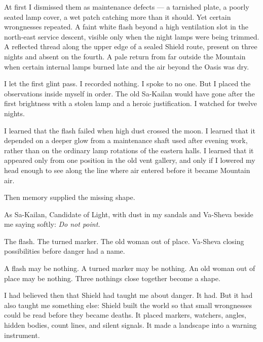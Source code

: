 At first I dismissed them as maintenance defects --- a tarnished plate, a poorly seated lamp cover, a wet patch catching more than it should. Yet certain wrongnesses repeated. A faint white flash beyond a high ventilation slot in the north-east service descent, visible only when the night lamps were being trimmed. A reflected thread along the upper edge of a sealed Shield route, present on three nights and absent on the fourth. A pale return from far outside the Mountain when certain internal lamps burned late and the air beyond the Oasis was dry.\par

I let the first glint pass. I recorded nothing. I spoke to no one. But I placed the observations inside myself in order. The old Sa-Kailan would have gone after the first brightness with a stolen lamp and a heroic justification. I watched for twelve nights.\par

I learned that the flash failed when high dust crossed the moon. I learned that it depended on a deeper glow from a maintenance shaft used after evening work, rather than on the ordinary lamp rotations of the eastern halls. I learned that it appeared only from one position in the old vent gallery, and only if I lowered my head enough to see along the line where air entered before it became Mountain air.\par

Then memory supplied the missing shape.\par

As Sa-Kailan, Candidate of Light, with dust in my sandals and Va-Sheva beside me saying softly: \textit{Do not point.}\par

The flash. The turned marker. The old woman out of place. Va-Sheva closing possibilities before danger had a name.\par

A flash may be nothing. A turned marker may be nothing. An old woman out of place may be nothing. Three nothings close together become a shape.\par

I had believed then that Shield had taught me about danger. It had. But it had also taught me something else: Shield built the world so that small wrongnesses could be read before they became deaths. It placed markers, watchers, angles, hidden bodies, count lines, and silent signals. It made a landscape into a warning instrument.\par

